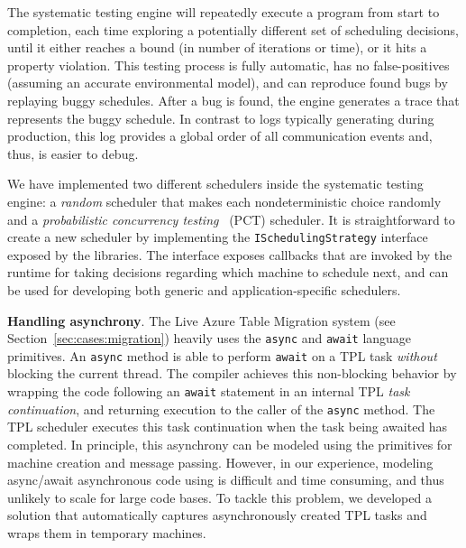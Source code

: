 The \psharp systematic testing engine will repeatedly execute a program from start to completion, each time exploring a potentially different set of scheduling decisions, until it either reaches a bound (in number of iterations or time), or it hits a property violation. This testing process is fully automatic, has no false-positives (assuming an accurate environmental model), and can reproduce found bugs by replaying buggy schedules. After a bug is found, the engine generates a trace that represents the buggy schedule. In contrast to logs typically generating during production, this log provides a global order of all communication events and, thus, is easier to debug.

We have implemented two different schedulers inside the \psharp systematic testing engine: a \emph{random} scheduler that makes each nondeterministic choice randomly and a \emph{probabilistic concurrency testing}~\cite{burckhardt2010pct} (PCT) scheduler. It is straightforward to create a new scheduler by implementing the \texttt{ISchedulingStrategy} interface~\cite{desai2015systematic} exposed by the \psharp libraries. The interface exposes callbacks that are invoked by the \psharp runtime for taking decisions regarding which machine to schedule next, and can be used for developing both generic and application-specific schedulers.

\textbf{Handling  asynchrony}.
The Live Azure Table Migration system (see Section~\ref{sec:cases:migration}) heavily uses the \texttt{async} and \texttt{await}  language primitives. An \texttt{async} method is able to perform \texttt{await} on a TPL task \emph{without} blocking the current thread. The \csharp compiler achieves this non-blocking behavior by wrapping the code following an \texttt{await} statement in an internal TPL \emph{task continuation}, and returning execution to the caller of the \texttt{async} method. The TPL scheduler executes this task continuation when the task being awaited has completed. In principle, this asynchrony can be modeled using the \psharp primitives for machine creation and message passing. However, in our experience, modeling async/await asynchronous code using \psharp is difficult and time consuming, and thus unlikely to scale for large code bases. To tackle this problem, we developed a solution that automatically captures asynchronously created TPL tasks and wraps them in temporary \psharp machines.

